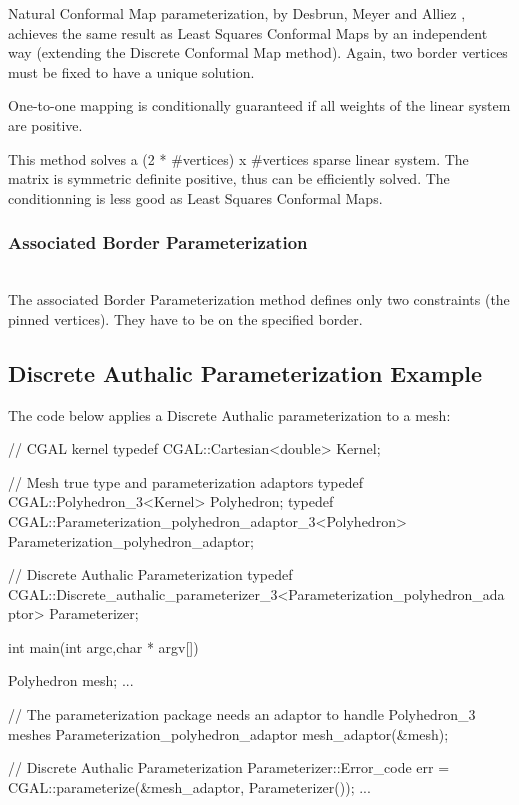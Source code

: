 Natural Conformal Map parameterization, by Desbrun, Meyer and Alliez
\cite{cgal:dma-ipsm-02}, achieves the same result as
Least Squares Conformal Maps by an independent
way (extending the Discrete Conformal Map method). Again,
two border vertices must be fixed to have a unique solution.

One-to-one mapping is conditionally guaranteed if all weights
of the linear system are positive.

This method solves a (2 * \#vertices) x \#vertices sparse linear system.
The matrix is symmetric definite positive, thus can be
efficiently solved. The conditionning is less good as Least Squares Conformal Maps.


\subsubsection{Associated Border Parameterization}

  \\

The associated Border Parameterization method defines only two constraints
(the pinned vertices). They have to be on the specified border.


\subsection{Discrete Authalic Parameterization Example}

The code below applies a Discrete Authalic parameterization to a  mesh:

\begin{ccExampleCode}

// CGAL kernel
typedef CGAL::Cartesian<double>                         Kernel;

// Mesh true type and parameterization adaptors
typedef CGAL::Polyhedron_3<Kernel>                      Polyhedron;
typedef CGAL::Parameterization_polyhedron_adaptor_3<Polyhedron>
                                                        Parameterization_polyhedron_adaptor;

// Discrete Authalic Parameterization
typedef CGAL::Discrete_authalic_parameterizer_3<Parameterization_polyhedron_adaptor>
                                                        Parameterizer;

int main(int argc,char * argv[])
{
    Polyhedron mesh;
    ...

    // The parameterization package needs an adaptor to handle Polyhedron_3 meshes
    Parameterization_polyhedron_adaptor mesh_adaptor(&mesh);

    // Discrete Authalic Parameterization
    Parameterizer::Error_code err = CGAL::parameterize(&mesh_adaptor, Parameterizer());
    ...
}

\end{ccExampleCode}

